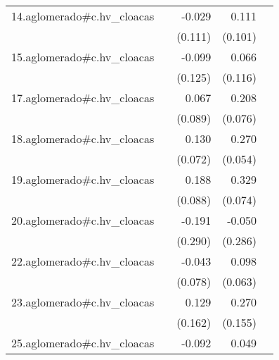 {\begin{longtable}{l*{4}{D{.}{.}{-1}}}
\addlinespace
14.aglomerado#c.hv\_cloacas&                     &      -0.029         &       0.111         &                     \\
            &                     &     (0.111)         &     (0.101)         &                     \\
\addlinespace
15.aglomerado#c.hv\_cloacas&                     &      -0.099         &       0.066         &                     \\
            &                     &     (0.125)         &     (0.116)         &                     \\
\addlinespace
17.aglomerado#c.hv\_cloacas&                     &       0.067         &       0.208\sym{**} &                     \\
            &                     &     (0.089)         &     (0.076)         &                     \\
\addlinespace
18.aglomerado#c.hv\_cloacas&                     &       0.130         &       0.270\sym{***}&                     \\
            &                     &     (0.072)         &     (0.054)         &                     \\
\addlinespace
19.aglomerado#c.hv\_cloacas&                     &       0.188\sym{*}  &       0.329\sym{***}&                     \\
            &                     &     (0.088)         &     (0.074)         &                     \\
\addlinespace
20.aglomerado#c.hv\_cloacas&                     &      -0.191         &      -0.050         &                     \\
            &                     &     (0.290)         &     (0.286)         &                     \\
\addlinespace
22.aglomerado#c.hv\_cloacas&                     &      -0.043         &       0.098         &                     \\
            &                     &     (0.078)         &     (0.063)         &                     \\
\addlinespace
23.aglomerado#c.hv\_cloacas&                     &       0.129         &       0.270         &                     \\
            &                     &     (0.162)         &     (0.155)         &                     \\
\addlinespace
25.aglomerado#c.hv\_cloacas&                     &      -0.092         &       0.049         &                     \\

\end{longtable}}
